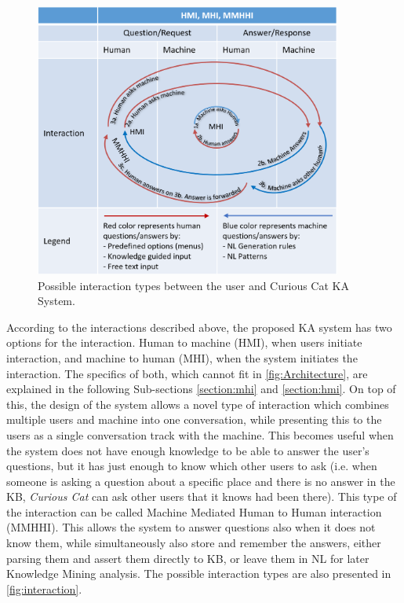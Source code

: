 \begin{figure}[htb]
	\centering
		\includegraphics[width=0.9\textwidth]{figures/interactionLoop.png}
	\caption{Possible interaction types between the user and Curious Cat KA
			 System.}
	\label{fig:interaction}
\end{figure}

According to the interactions described above, the proposed KA system has two 
options for the interaction. Human to machine (HMI), when users initiate 
interaction, and machine to human (MHI), when the system initiates the 
interaction. The specifics of both, which cannot fit in 
\autoref{fig:Architecture}, are explained in the following Sub-sections 
\ref{section:mhi} and \ref{section:hmi}. On top of this, the design of the 
system allows a novel 
type of interaction which combines multiple users and machine into one 
conversation, while presenting this to the users as a single conversation track
with the machine. This becomes useful when the system does not have enough
knowledge to be able to answer the user's questions, but it has just enough to know which other users to ask (i.e. when someone is asking a question about a specific place and there is no answer in the KB, \emph{Curious Cat} can ask other users that it knows had been there). This type of the interaction can be called Machine Mediated Human to Human interaction (MMHHI). This allows the system to answer questions also when it does not know them, while simultaneously also
store and remember the answers, either parsing them and assert them directly to 
KB, or leave them in NL for later Knowledge Mining analysis. The possible
interaction types are also presented in \autoref{fig:interaction}.


